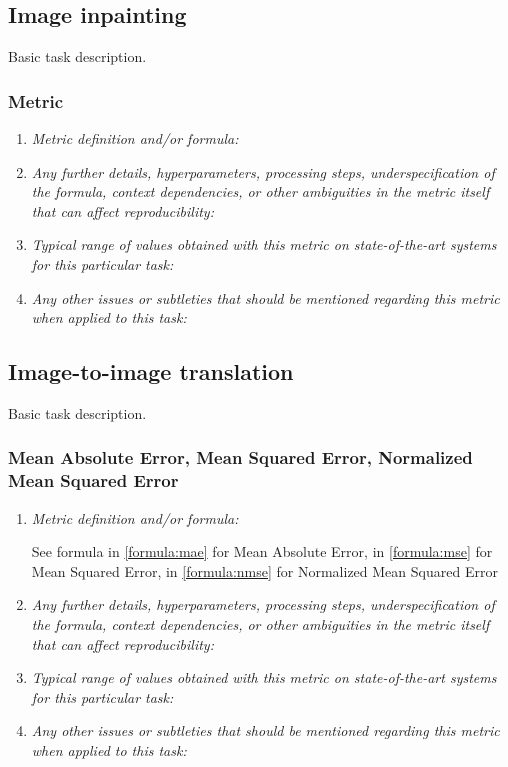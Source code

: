 \documentclass[a4paper,11pt]{article}
\begin{document}
    \subsection{Image inpainting} \label{image_inpainting}
        Basic task description.
        \subsubsection{Metric}
            \begin{enumerate}[label=\alph*.]
                \item \textit{Metric definition and/or formula:}
                \bigskip
                \item \textit{Any further details, hyperparameters, processing steps, underspecification of the formula, context dependencies, or other ambiguities in the metric itself that can affect reproducibility:}
                \bigskip
                \item \textit{Typical range of values obtained with this metric on state-of-the-art systems for this particular task:}
                \bigskip
                \item \textit{Any other issues or subtleties that should be mentioned regarding this metric when applied to this task:}
                \bigskip
            \end{enumerate}

    \subsection{Image-to-image translation}
        Basic task description.
        \subsubsection{Mean Absolute Error, Mean Squared Error, Normalized Mean Squared Error}
            \begin{enumerate}[label=\alph*.]
                \item \textit{Metric definition and/or formula:}

                See formula in \ref{formula:mae} for Mean Absolute Error, in \ref{formula:mse} for Mean Squared Error, in \ref{formula:nmse} for Normalized Mean Squared Error
                \bigskip
                \item \textit{Any further details, hyperparameters, processing steps, underspecification of the formula, context dependencies, or other ambiguities in the metric itself that can affect reproducibility:}
                \bigskip
                \item \textit{Typical range of values obtained with this metric on state-of-the-art systems for this particular task:}
                \bigskip
                \item \textit{Any other issues or subtleties that should be mentioned regarding this metric when applied to this task:}
                \bigskip
            \end{enumerate}
\end{document}
